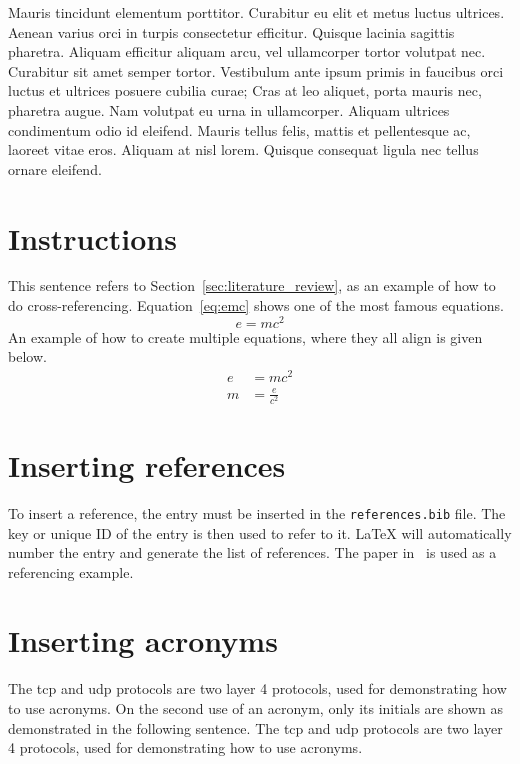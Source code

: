 Mauris tincidunt elementum porttitor.
Curabitur eu elit et metus luctus ultrices.
Aenean varius orci in turpis consectetur efficitur.
Quisque lacinia sagittis pharetra.
Aliquam efficitur aliquam arcu, vel ullamcorper tortor volutpat nec.
Curabitur sit amet semper tortor.
Vestibulum ante ipsum primis in faucibus orci luctus et ultrices posuere cubilia
curae; Cras at leo aliquet, porta mauris nec, pharetra augue.
Nam volutpat eu urna in ullamcorper.
Aliquam ultrices condimentum odio id eleifend.
Mauris tellus felis, mattis et pellentesque ac, laoreet vitae eros.
Aliquam at nisl lorem.
Quisque consequat ligula nec tellus ornare eleifend.

\section{Instructions}%
\label{sec:instructions}

This sentence refers to Section~\ref{sec:literature_review}, as an example of
how to do cross-referencing.
Equation~\eqref{eq:emc} shows one of the most famous equations.
%
\begin{equation}
    \label{eq:emc}
    e = mc^2
\end{equation}
%
An example of how to create multiple equations, where they all align is given
below.
%
\begin{align}
    e & = mc^2          \\
    m & = \frac{e}{c^2}
\end{align}

\section{Inserting references}%
\label{sec:inserting_references}

To insert a reference, the entry must be inserted in the \texttt{references.bib}
file.
The key or unique ID of the entry is then used to refer to it.
\LaTeX{} will automatically number the entry and generate the list of
references.
The paper in~\cite{sample_key} is used as a referencing example.

\section{Inserting acronyms}%
\label{sec:inserting_acronyms_and_glossary_entries}

The \gls{tcp} and \gls{udp} protocols are two layer 4 protocols, used for
demonstrating how to use acronyms.
On the second use of an acronym, only its initials are shown as demonstrated in
the following sentence.
The \gls{tcp} and \gls{udp} protocols are two layer 4 protocols, used for
demonstrating how to use acronyms.

